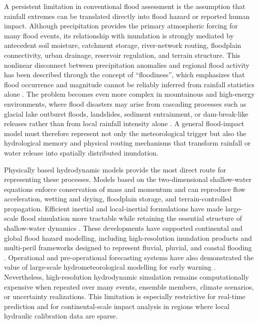 \documentclass[pdflatex,sn-mathphys-ay]{sn-jnl}
\theoremstyle{thmstyleone}
\theoremstyle{thmstylethree}
\theoremstyle{thmstyletwo}
\begin{document}
A persistent limitation in conventional flood assessment is the
assumption that rainfall extremes can be translated directly into flood
hazard or reported human impact.  Although precipitation provides the
primary atmospheric forcing for many flood events, its relationship
with inundation is strongly mediated by antecedent soil moisture,
catchment storage, river-network routing, floodplain connectivity,
urban drainage, reservoir regulation, and terrain structure.  This
nonlinear disconnect between precipitation anomalies and regional flood
activity has been described through the concept of ``floodiness'',
which emphasizes that flood occurrence and magnitude cannot be
reliably inferred from rainfall statistics alone
\citep{Stephens2015}.  The problem becomes even more complex in
mountainous and high-energy environments, where flood disasters may
arise from cascading processes such as glacial lake outburst floods,
landslides, sediment entrainment, or dam-break-like releases rather
than from local rainfall intensity alone \citep{Sattar2025}.  A
general flood-impact model must therefore represent not only the
meteorological trigger but also the hydrological memory and physical
routing mechanisms that transform rainfall or water release into
spatially distributed inundation.

Physically based hydrodynamic models provide the most direct route for
representing these processes.  Models based on the two-dimensional
shallow-water equations enforce conservation of mass and momentum and
can reproduce flow acceleration, wetting and drying, floodplain
storage, and terrain-controlled propagation.  Efficient inertial and
local-inertial formulations have made large-scale flood simulation more
tractable while retaining the essential structure of shallow-water
dynamics \citep{Bates2010,Almeida2013,Xia2017}.  These developments
have supported continental and global flood hazard modelling, including
high-resolution inundation products and multi-peril frameworks
designed to represent fluvial, pluvial, and coastal flooding
\citep{Sampson2015,Dottori2016,Trigg2016,Wing2019}.  Operational and
pre-operational forecasting systems have also demonstrated the value of
large-scale hydrometeorological modelling for early warning
\citep{Thielen2009,Alfieri2013,Pappenberger2015}.  Nevertheless,
high-resolution hydrodynamic simulation remains computationally
expensive when repeated over many events, ensemble members, climate
scenarios, or uncertainty realizations.  This limitation is especially
restrictive for real-time prediction and for continental-scale impact
analysis in regions where local hydraulic calibration data are sparse.
\end{document}
